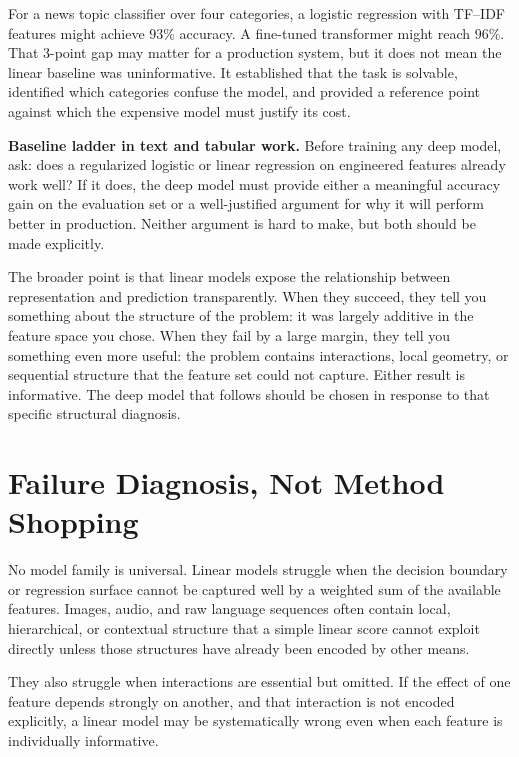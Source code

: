 \begin{example}
For a news topic classifier over four categories, a logistic regression with TF--IDF features might achieve $93\%$ accuracy. A fine-tuned transformer might reach $96\%$. That $3$-point gap may matter for a production system, but it does not mean the linear baseline was uninformative. It established that the task is solvable, identified which categories confuse the model, and provided a reference point against which the expensive model must justify its cost.
\end{example}

\begin{thinkingtool}
\textbf{Baseline ladder in text and tabular work.} Before training any deep model, ask: does a regularized logistic or linear regression on engineered features already work well? If it does, the deep model must provide either a meaningful accuracy gain on the evaluation set or a well-justified argument for why it will perform better in production. Neither argument is hard to make, but both should be made explicitly.
\end{thinkingtool}

The broader point is that linear models expose the relationship between representation and prediction transparently. When they succeed, they tell you something about the structure of the problem: it was largely additive in the feature space you chose. When they fail by a large margin, they tell you something even more useful: the problem contains interactions, local geometry, or sequential structure that the feature set could not capture. Either result is informative. The deep model that follows should be chosen in response to that specific structural diagnosis.

\section{Failure Diagnosis, Not Method Shopping}

No model family is universal. Linear models struggle when the decision boundary or regression surface cannot be captured well by a weighted sum of the available features. Images, audio, and raw language sequences often contain local, hierarchical, or contextual structure that a simple linear score cannot exploit directly unless those structures have already been encoded by other means.

They also struggle when interactions are essential but omitted. If the effect of one feature depends strongly on another, and that interaction is not encoded explicitly, a linear model may be systematically wrong even when each feature is individually informative.

